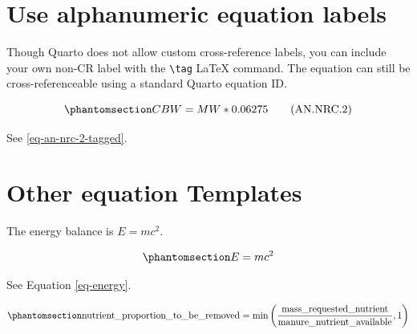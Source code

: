 \documentclass[
  letterpaper,
  oneside,
  openany]{scrbook}
\begin{document}
\section{Use alphanumeric equation
labels}\label{use-alphanumeric-equation-labels}

Though Quarto does not allow custom cross-reference labels, you can
include your own non-CR label with the \texttt{\textbackslash{}tag}
LaTeX command. The equation can still be cross-referenceable using a
standard Quarto equation ID.

\begin{equation}\protect\phantomsection\label{eq-an-nrc-2-tagged}{
CBW = MW * 0.06275 \tag{AN.NRC.2}
}\end{equation}

See \ref{eq-an-nrc-2-tagged}.

\section{Other equation Templates}\label{other-equation-templates}

The energy balance is \(E = mc^2\).

\begin{equation}\protect\phantomsection\label{eq-energy}{
E = mc^2
}\end{equation}

See Equation \ref{eq-energy}.

\begin{equation}\protect\phantomsection\label{eq-nutrient-proportion}{
\text{nutrient\_proportion\_to\_be\_removed} =
\min\left(
\frac{\text{mass\_requested\_nutrient}}{\text{manure\_nutrient\_available}},
1
\right)
}\end{equation}
\end{document}
